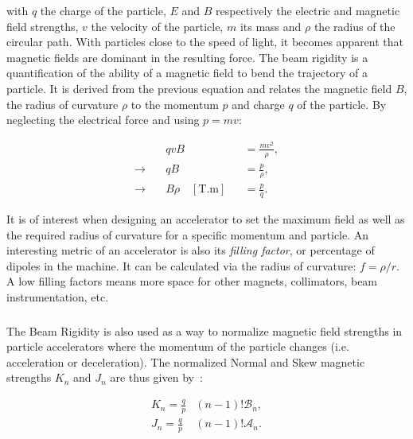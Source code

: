 with $q$ the charge of the particle, $E$ and $B$ respectively the electric and magnetic field
strengths, $v$ the velocity of the particle, $m$ its mass and $\rho$ the radius of the circular
path. With particles close to the speed of light, it becomes apparent that magnetic fields are
dominant in the resulting force.
The beam rigidity is a quantification of the ability of a magnetic field to bend the trajectory of a
particle. It is derived from the previous equation and relates the
magnetic field $B$, the radius of curvature $\rho$ to the momentum $p$ and charge $q$ of the
particle. By neglecting the electrical force and using $p = mv$:

\begin{equation}
    \begin{aligned}
                           & qvB &&= \frac{mv^2}{\rho}, \\
        \rightarrow  \quad & qB &&= \frac{p}{\rho}, \\
        \rightarrow  \quad & B\rho \quad [\textrm{T.m}] &&= \frac{p}{q}.
    \end{aligned}
    \label{eq:magnetic_fields_beam_rigidity}
\end{equation}

It is of interest when designing an accelerator to set the maximum field as well as the required
radius of curvature for a specific momentum and particle.
An interesting metric of an accelerator is also its \textit{filling factor}, or percentage of
dipoles in the machine. It can be calculated via the radius of curvature: $f = \rho / r$. A low 
filling factors means more space for other magnets, collimators, beam instrumentation, etc.

\subsubsection{}

The Beam Rigidity is also used as a way to normalize magnetic field strengths in particle
accelerators where the momentum of the particle changes (i.e. acceleration or deceleration).
The normalized Normal and Skew magnetic strengths $K_n$ and $J_n$ are thus given
by~\cite{wolf_engineering_2001}:

\begin{equation}
    \begin{aligned}
        K_n =  \frac{q}{p} &(n-1)! \mathcal{B}_n, \\ 
        J_n =  \frac{q}{p} &(n-1)! \mathcal{A}_n.
    \end{aligned}
    \label{eq:magnetic_fields_normalized}
\end{equation}



